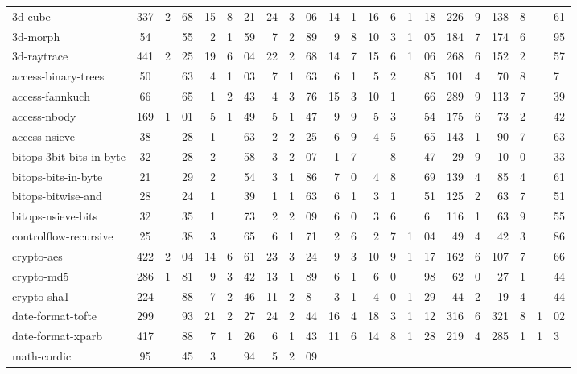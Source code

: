 \begin{figure*}
\begin{tabular}{|l|c|r@{.}lr|r@{.}lr|r@{.}l|r@{.}lr@{.}l|r@{.}l|r@{.}lr@{.}l|r@{.}l|}
3d-cube                  & 337 & 2&68 & 15 & 8&21 & 24 & 3&06
    & 14&1 & 16&6 & 1&18 & 226&9 & 138&8 & &61 \\
3d-morph                 & 54  & &55 & 2   & 1&59 & 7  & 2&89 
    & 9&8  & 10&3 & 1&05 & 184&7 & 174&6 & &95 \\
3d-raytrace              & 441 & 2&25 & 19 & 6&04 & 22 & 2&68
    & 14&7 & 15&6 & 1&06 & 268&6 & 152&2 & &57 \\
access-binary-trees      & 50  & &63 & 4   & 1&03 & 7  & 1&63
    & 6&1  & 5&2 & &85   & 101&4 & 70&8  & &7 \\
access-fannkuch          & 66  & &65  & 1  & 2&43 & 4  & 3&76
    & 15&3 & 10&1 & &66  & 289&9 & 113&7 & &39 \\
access-nbody             & 169 & 1&01 & 5  & 1&49 & 5  & 1&47
    & 9&9  & 5&3 & &54   & 175&6 & 73&2  & &42 \\
access-nsieve            & 38  & &28 & 1   & &63 & 2   & 2&25
    & 6&9  & 4&5 & &65   & 143&1 & 90&7  & &63 \\
bitops-3bit-bits-in-byte & 32  & &28 & 2   & &58 & 3   & 2&07
    & 1&7  & &8 & &47    & 29&9 & 10&0   & &33 \\
bitops-bits-in-byte      & 21  & &29 & 2   & &54 & 3   & 1&86
    & 7&0  & 4&8 & &69   & 139&4 & 85&4  & &61 \\
bitops-bitwise-and       & 28  & &24 & 1   & &39 & 1   & 1&63
    & 6&1  & 3&1 & &51   & 125&2 & 63&7  & &51 \\
bitops-nsieve-bits       & 32  & &35 & 1   & &73 & 2   & 2&09
    & 6&0  & 3&6 & &6    & 116&1 & 63&9  & &55 \\
controlflow-recursive    & 25  & &38 & 3   & &65 & 6   & 1&71
    & 2&6  & 2&7 & 1&04  & 49&4  & 42&3  & &86 \\
crypto-aes               & 422 & 2&04 & 14 & 6&61 & 23 & 3&24
    & 9&3  & 10&9 & 1&17 & 162&6 & 107&7 & &66 \\
crypto-md5               & 286 & 1&81 & 9  & 3&42 & 13 & 1&89
    & 6&1  & 6&0 & &98   & 62&0  & 27&1  & &44 \\
crypto-sha1              & 224 & &88 & 7   & 2&46 & 11 & 2&8
    & 3&1  & 4&0 & 1&29  & 44&2  & 19&4  & &44 \\
date-format-tofte        & 299 & &93 & 21  & 2&27 & 24 & 2&44
    & 16&4 & 18&3 & 1&12 & 316&6 & 321&8 & 1&02 \\
date-format-xparb        & 417 & &88 & 7   & 1&26 & 6  & 1&43
    & 11&6 & 14&8 & 1&28 & 219&4 & 285&1 & 1&3 \\
math-cordic              & 95  & &45 & 3   & &94 & 5   & 2&09

\end{tabular}
\end{figure*}
